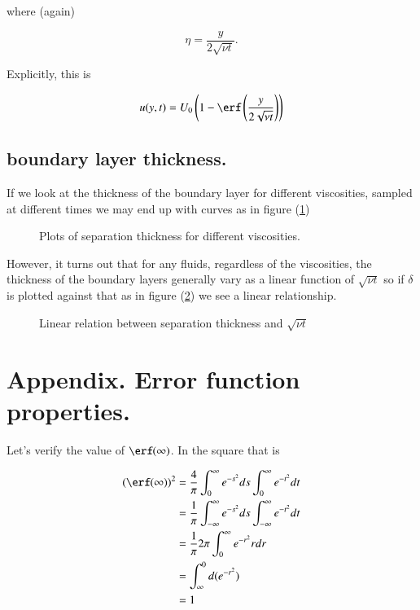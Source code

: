 where (again)

\begin{equation}\label{eqn:continuumL16:610}
\eta = \frac{y}{2 \sqrt{\nu t}}.
\end{equation}

Explicitly, this is

\begin{equation}\label{eqn:continuumL16:590b}
u(y, t) = U_0 \left(1 - \erf\left(\frac{y}{2 \sqrt{\nu t}}\right) \right)
\end{equation}

\subsection{boundary layer thickness.}

If we look at the thickness of the boundary layer for different viscosities, sampled at different times we may end up with curves as in figure (\ref{fig:continuumL16:continuumL16Fig4a})

\begin{figure}[htp]
   \centering
   \def\svgwidth{0.3\columnwidth}
%
   \caption{Plots of separation thickness for different viscosities.}\label{fig:continuumL16:continuumL16Fig4a}
\end{figure}

However, it turns out that for any fluids, regardless of the viscosities, the thickness of the boundary layers generally vary as a linear function of $\sqrt{\nu t}$ so if $\delta$ is plotted against that as in figure (\ref{fig:continuumL16:continuumL16Fig4b}) we see a linear relationship.

\begin{figure}[htp]
   \centering
   \def\svgwidth{0.3\columnwidth}
%
   \caption{Linear relation between separation thickness and $\sqrt{\nu t}$}\label{fig:continuumL16:continuumL16Fig4b}
\end{figure}

\section{Appendix.  Error function properties.}

Let's verify the value of $\erf(\infty)$.  In the square that is

\begin{align*}
(\erf(\infty))^2 
&=
\frac{4}{\pi} 
\int_0^\infty e^{-s^2} ds
\int_0^\infty e^{-t^2} dt \\
&=
\frac{1}{\pi} 
\int_{-\infty}^\infty e^{-s^2} ds
\int_{-\infty}^\infty e^{-t^2} dt \\
&=
\frac{1}{\pi} 2 \pi
\int_{0}^\infty e^{-r^2} r dr \\
&=
\int_\infty^0 d( e^{-r^2} ) \\
&= 1
\end{align*}

\EndArticle
